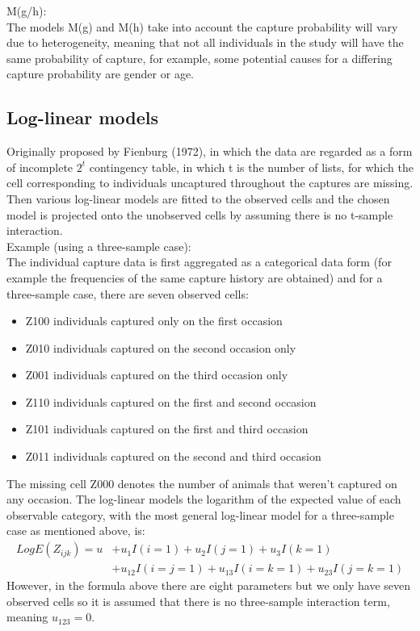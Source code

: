 \documentclass[,oneside]{article}
\numberwithin{equation}{section}
\begin{document}
M(g/h):\\
The models M(g) and M(h) take into account the capture probability will vary due to heterogeneity, meaning that not all individuals in the study will have the same probability of capture, for example, some potential causes for a differing capture probability are gender or age.
\subsection{Log-linear models}
Originally proposed by Fienburg (1972), in which the data are regarded as a form of incomplete $2^t$ contingency table, in which t is the number of lists, for which the cell corresponding to individuals uncaptured throughout the captures are missing. Then various log-linear models are fitted to the observed cells and the chosen model is projected onto the unobserved cells by assuming there is no t-sample interaction. \\
Example (using a three-sample case): \\
The individual capture data is first aggregated as a categorical data form (for example the frequencies of the same capture history are obtained) and for a three-sample case, there are seven observed cells: 
\begin{itemize}
\item Z100 \hspace{1cm}individuals captured only on the first occasion
\item Z010 \hspace{1cm}individuals captured on the second occasion only
\item Z001 \hspace{1cm}individuals captured on the third occasion only
\item Z110 \hspace{1cm}individuals captured on the first and second occasion
\item Z101 \hspace{1cm}individuals captured on the first and third occasion
\item Z011 \hspace{1cm}individuals captured on the second and third occasion
\end{itemize}

The missing cell Z000 denotes the number of animals that weren't captured on any occasion. The log-linear models the logarithm of the expected value of each observable category, with the most general log-linear model for a three-sample case as mentioned above, is:
\begin{align}
LogE(Z_{ijk})=u&+u_1I(i=1)+u_2I(j=1)+u_3I(k=1)\nonumber \\ & +u_{12}I(i=j=1)+u_{13}I(i=k=1)+u_{23}I(j=k=1)
\end{align}
However, in the formula above there are eight parameters but we only have seven observed cells so it is assumed that there is no three-sample interaction term, meaning $u_{123} = 0$.
\end{document}
